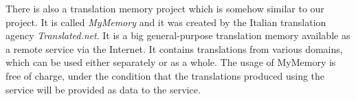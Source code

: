 There is also a translation memory project which is somehow similar to our project. It is called \emph{MyMemory} and it was created by the Italian translation agency \emph{Translated.net}. It is a big general-purpose translation memory available as a remote service via the Internet. It contains translations from various domains, which can be used either separately or as a whole. The usage of MyMemory is free of charge, under the condition that the translations produced using the service will be provided as data to the service.
